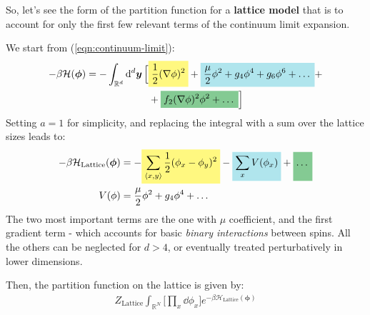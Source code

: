 \documentclass[../../main.tex]{subfiles}
\begin{document}
So, let's see the form of the partition function for a \textbf{lattice model} that is  to account for only the first few relevant terms of the continuum limit expansion. 

We start from (\ref{eqn:continuum-limit}):
\begin{align*}
    -\beta \mathcal{H}(\bm{\phi}) = - \int_{\mathbb{R}^d} \dd[d]{\bm{y}} \Big[&\hlc{Yellow}{\frac{1}{2}(\nabla \phi)^2 }+ \hlc{SkyBlue}{\frac{\mu}{2} \phi^2 + g_4 \phi^4 + g_6 \phi^6 + \dots} +\\
    &+ \hlc{ForestGreen}{f_2 (\nabla \phi)^2 \phi^2 + \dots} \Big]
\end{align*}
Setting $a=1$ for simplicity, and replacing the integral with a sum over the lattice sizes leads to:
\begin{align}\label{eqn:H-lattice}
    -\beta \mathcal{H}_{\mathrm{Lattice}}(\bm{\phi}) &= -\hlc{Yellow}{\sum_{\langle x,y \rangle} \frac{1}{2}(\phi_x - \phi_y)^2} - \hlc{SkyBlue}{\sum_x V(\phi_x)} + \hlc{ForestGreen}{\dots\vphantom{\sum_x}} \\ \label{eqn:V-lattice}
    V(\phi) &= \frac{\mu}{2} \phi^2 + g_4 \phi^4 + \dots  
\end{align}
The two most important terms are the one with $\mu$ coefficient, and the first gradient term - which accounts for basic \textit{binary interactions} between spins. All the others can be neglected for $d > 4$, or eventually treated perturbatively in lower dimensions.

\medskip

Then, the partition function on the lattice is given by:
\begin{align*}
    Z_{\mathrm{Lattice}} \int_{\mathbb{R}^N} \Big[\prod_x \dd{\phi_x}\Big] e^{-\beta \mathcal{H}_{\mathrm{Lattice}}(\bm{\phi})}
\end{align*}
\end{document}
